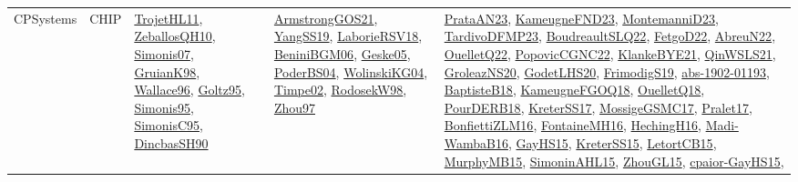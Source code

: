 {\begin{longtable}{lp{3cm}>{\raggedright}p{6cm}>{\raggedright}p{6cm}p{8cm}}
CPSystems & CHIP & \href{articles/TrojetHL11.pdf}{TrojetHL11}\cite{TrojetHL11}, \href{articles/ZeballosQH10.pdf}{ZeballosQH10}\cite{ZeballosQH10}, \href{articles/Simonis07.pdf}{Simonis07}\cite{Simonis07}, \href{papers/GruianK98.pdf}{GruianK98}\cite{GruianK98}, \href{articles/Wallace96.pdf}{Wallace96}\cite{Wallace96}, \href{papers/Goltz95.pdf}{Goltz95}\cite{Goltz95}, \href{papers/Simonis95.pdf}{Simonis95}\cite{Simonis95}, \href{papers/SimonisC95.pdf}{SimonisC95}\cite{SimonisC95}, \href{articles/DincbasSH90.pdf}{DincbasSH90}\cite{DincbasSH90} & \href{papers/ArmstrongGOS21.pdf}{ArmstrongGOS21}\cite{ArmstrongGOS21}, \href{papers/YangSS19.pdf}{YangSS19}\cite{YangSS19}, \href{articles/LaborieRSV18.pdf}{LaborieRSV18}\cite{LaborieRSV18}, \href{papers/BeniniBGM06.pdf}{BeniniBGM06}\cite{BeniniBGM06}, \href{papers/Geske05.pdf}{Geske05}\cite{Geske05}, \href{articles/PoderBS04.pdf}{PoderBS04}\cite{PoderBS04}, \href{papers/WolinskiKG04.pdf}{WolinskiKG04}\cite{WolinskiKG04}, \href{articles/Timpe02.pdf}{Timpe02}\cite{Timpe02}, \href{papers/RodosekW98.pdf}{RodosekW98}\cite{RodosekW98}, \href{articles/Zhou97.pdf}{Zhou97}\cite{Zhou97} & \href{articles/PrataAN23.pdf}{PrataAN23}\cite{PrataAN23}, \href{papers/KameugneFND23.pdf}{KameugneFND23}\cite{KameugneFND23}, \href{articles/MontemanniD23.pdf}{MontemanniD23}\cite{MontemanniD23}, \href{papers/TardivoDFMP23.pdf}{TardivoDFMP23}\cite{TardivoDFMP23}, \href{papers/BoudreaultSLQ22.pdf}{BoudreaultSLQ22}\cite{BoudreaultSLQ22}, \href{articles/FetgoD22.pdf}{FetgoD22}\cite{FetgoD22}, \href{articles/AbreuN22.pdf}{AbreuN22}\cite{AbreuN22}, \href{papers/OuelletQ22.pdf}{OuelletQ22}\cite{OuelletQ22}, \href{papers/PopovicCGNC22.pdf}{PopovicCGNC22}\cite{PopovicCGNC22}, \href{papers/KlankeBYE21.pdf}{KlankeBYE21}\cite{KlankeBYE21}, \href{articles/QinWSLS21.pdf}{QinWSLS21}\cite{QinWSLS21}, \href{papers/GroleazNS20.pdf}{GroleazNS20}\cite{GroleazNS20}, \href{papers/GodetLHS20.pdf}{GodetLHS20}\cite{GodetLHS20}, \href{papers/FrimodigS19.pdf}{FrimodigS19}\cite{FrimodigS19}, \href{articles/abs-1902-01193.pdf}{abs-1902-01193}\cite{abs-1902-01193}, \href{articles/BaptisteB18.pdf}{BaptisteB18}\cite{BaptisteB18}, \href{papers/KameugneFGOQ18.pdf}{KameugneFGOQ18}\cite{KameugneFGOQ18}, \href{papers/OuelletQ18.pdf}{OuelletQ18}\cite{OuelletQ18}, \href{articles/PourDERB18.pdf}{PourDERB18}\cite{PourDERB18}, \href{articles/KreterSS17.pdf}{KreterSS17}\cite{KreterSS17}, \href{papers/MossigeGSMC17.pdf}{MossigeGSMC17}\cite{MossigeGSMC17}, \href{papers/Pralet17.pdf}{Pralet17}\cite{Pralet17}, \href{papers/BonfiettiZLM16.pdf}{BonfiettiZLM16}\cite{BonfiettiZLM16}, \href{papers/FontaineMH16.pdf}{FontaineMH16}\cite{FontaineMH16}, \href{papers/HechingH16.pdf}{HechingH16}\cite{HechingH16}, \href{papers/Madi-WambaB16.pdf}{Madi-WambaB16}\cite{Madi-WambaB16}, \href{papers/GayHS15.pdf}{GayHS15}\cite{GayHS15}, \href{papers/KreterSS15.pdf}{KreterSS15}\cite{KreterSS15}, \href{articles/LetortCB15.pdf}{LetortCB15}\cite{LetortCB15}, \href{papers/MurphyMB15.pdf}{MurphyMB15}\cite{MurphyMB15}, \href{articles/SimoninAHL15.pdf}{SimoninAHL15}\cite{SimoninAHL15}, \href{papers/ZhouGL15.pdf}{ZhouGL15}\cite{ZhouGL15}, \href{papers/cpaior-GayHS15.pdf}{cpaior-GayHS15}\cite{cpaior-GayHS15}, 
\end{longtable}}
